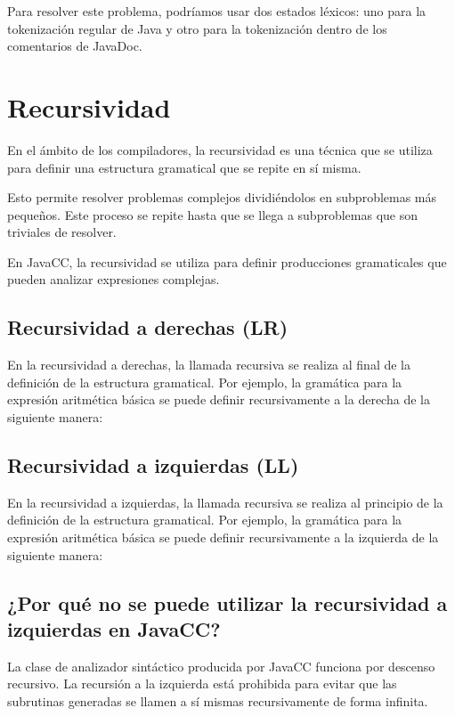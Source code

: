 Para resolver este problema, podríamos usar dos estados léxicos: uno para la tokenización regular de Java y otro para la tokenización dentro de los comentarios de JavaDoc.

\section{Recursividad}

En el ámbito de los compiladores, la recursividad es una técnica que se utiliza para definir una estructura gramatical que se repite en sí misma. 

Esto permite resolver problemas complejos dividiéndolos en subproblemas más pequeños. Este proceso se repite hasta que se llega a subproblemas que son triviales de resolver.

En JavaCC, la recursividad se utiliza para definir producciones gramaticales que pueden analizar expresiones complejas.

\subsection{Recursividad a derechas (LR)}
En la recursividad a derechas, la llamada recursiva se realiza al final de la definición de la estructura gramatical. Por ejemplo, la gramática para la expresión aritmética básica se puede definir recursivamente a la derecha de la siguiente manera:

\lstset{inputencoding=utf8/latin1}


\subsection{Recursividad a izquierdas (LL)}

En la recursividad a izquierdas, la llamada recursiva se realiza al principio de la definición de la estructura gramatical. Por ejemplo, la gramática para la expresión aritmética básica se puede definir recursivamente a la izquierda de la siguiente manera:

\lstset{inputencoding=utf8/latin1}




\subsection{¿Por qué no se puede utilizar la recursividad a izquierdas en JavaCC?}
La clase de analizador sintáctico producida por JavaCC funciona por descenso recursivo. La recursión a la izquierda está prohibida para evitar que las subrutinas generadas se llamen a sí mismas recursivamente de forma infinita.

